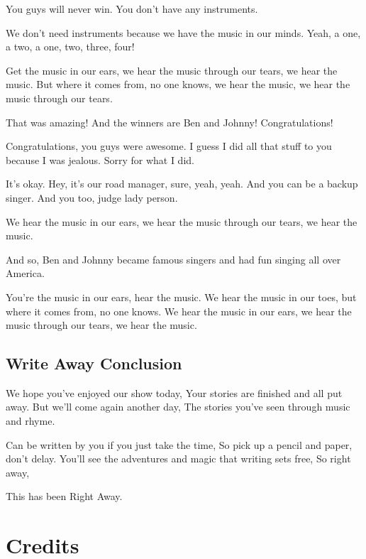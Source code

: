 You guys will never win.
You don't have any instruments.

We don't need instruments because we have the music in our minds.
Yeah, a one, a two, a one, two, three, four!

Get the music in our ears, we hear the music through our tears, we hear the music.
But where it comes from, no one knows, we hear the music, we hear the music through our tears.

That was amazing!
And the winners are Ben and Johnny!
Congratulations!

Congratulations, you guys were awesome.
I guess I did all that stuff to you because I was jealous.
Sorry for what I did.

It's okay.
Hey, it's our road manager, sure, yeah, yeah.
And you can be a backup singer.
And you too, judge lady person.

We hear the music in our ears, we hear the music through our tears, we hear the music.

And so, Ben and Johnny became famous singers and had fun singing all over America.

You're the music in our ears, hear the music.
We hear the music in our toes, but where it comes from, no one knows.
We hear the music in our ears, we hear the music through our tears, we hear the music.

\subsection{Write Away Conclusion}

We hope you've enjoyed our show today,
Your stories are finished and all put away.
But we'll come again another day,
The stories you've seen through music and rhyme.

Can be written by you if you just take the time,
So pick up a pencil and paper, don't delay.
You'll see the adventures and magic that writing sets free,
So right away,

This has been Right Away.

\section{Credits}